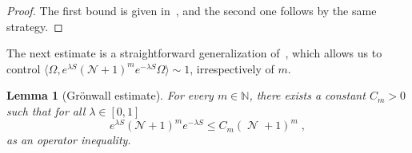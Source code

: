 \documentclass[12pt,a4paper]{article}
\numberwithin{equation}{section}
\newcommand{\NNN}{\mathbb{N}}
\newcommand{\1}{\mathbb{I}}
\newcommand{\HS}{\mathrm{HS}}
\DeclareMathOperator{\Z}{\mathbb{Z}}
\DeclareMathOperator{\NN}{\mathcal{N}}
\theoremstyle{plain}
\newtheorem{lemma}[theorem]{Lemma}
\theoremstyle{definition}
\theoremstyle{remark}
\theoremstyle{plain}
\theoremstyle{definition}
\theoremstyle{remark}
\begin{document}
\begin{proof}
The first bound is given in~\cite[Prop.~4.7]{CHN21}, and the second one follows by the same strategy.
\end{proof}


The next estimate is a straightforward generalization of~\cite[Prop.~5.8]{CHN21}, which allows us to control $ \langle \Omega, e^{\lambda S} (\mathcal{N} + 1)^m e^{-\lambda S} \Omega \rangle \sim 1 $, irrespectively of $ m $.

\begin{lemma}[Gr\"onwall estimate]\label{lem:gronNest}
For every $ m \in \NNN $, there exists a constant $ C_m > 0 $ such that for all $ \lambda\in [0,1]$
\begin{equation}\label{eq:gronest}
	e^{\lambda S} (\mathcal{N} +1)^m e^{-\lambda S}
	\leq C_m (\NN+1)^m \;,
\end{equation}
as an operator inequality.
\end{lemma}
\end{document}
